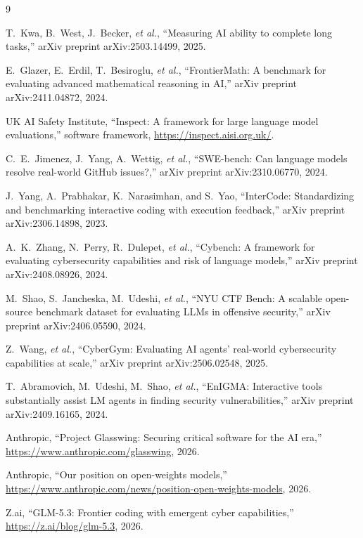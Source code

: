 \documentclass[11pt]{article}
\begin{document}
\newpage
\begin{thebibliography}{9}
\setlength{\itemsep}{2pt}

T.~Kwa, B.~West, J.~Becker, \emph{et al.},
``Measuring AI ability to complete long tasks,''
arXiv preprint arXiv:2503.14499, 2025.

E.~Glazer, E.~Erdil, T.~Besiroglu, \emph{et al.},
``FrontierMath: A benchmark for evaluating advanced mathematical reasoning in AI,''
arXiv preprint arXiv:2411.04872, 2024.

UK AI Safety Institute,
``Inspect: A framework for large language model evaluations,''
software framework, \url{https://inspect.aisi.org.uk/}.

C.~E.~Jimenez, J.~Yang, A.~Wettig, \emph{et al.},
``SWE-bench: Can language models resolve real-world GitHub issues?,''
arXiv preprint arXiv:2310.06770, 2024.

J.~Yang, A.~Prabhakar, K.~Narasimhan, and S.~Yao,
``InterCode: Standardizing and benchmarking interactive coding with execution feedback,''
arXiv preprint arXiv:2306.14898, 2023.

A.~K.~Zhang, N.~Perry, R.~Dulepet, \emph{et al.},
``Cybench: A framework for evaluating cybersecurity capabilities and risk of language models,''
arXiv preprint arXiv:2408.08926, 2024.

M.~Shao, S.~Jancheska, M.~Udeshi, \emph{et al.},
``NYU CTF Bench: A scalable open-source benchmark dataset for evaluating LLMs in offensive security,''
arXiv preprint arXiv:2406.05590, 2024.

Z.~Wang, \emph{et al.},
``CyberGym: Evaluating AI agents' real-world cybersecurity capabilities at scale,''
arXiv preprint arXiv:2506.02548, 2025.

T.~Abramovich, M.~Udeshi, M.~Shao, \emph{et al.},
``EnIGMA: Interactive tools substantially assist LM agents in finding security vulnerabilities,''
arXiv preprint arXiv:2409.16165, 2024.

Anthropic,
``Project Glasswing: Securing critical software for the AI era,''
\url{https://www.anthropic.com/glasswing}, 2026.

Anthropic,
``Our position on open-weights models,''
\url{https://www.anthropic.com/news/position-open-weights-models}, 2026.

Z.ai,
``GLM-5.3: Frontier coding with emergent cyber capabilities,''
\url{https://z.ai/blog/glm-5.3}, 2026.


\end{thebibliography}
\end{document}
